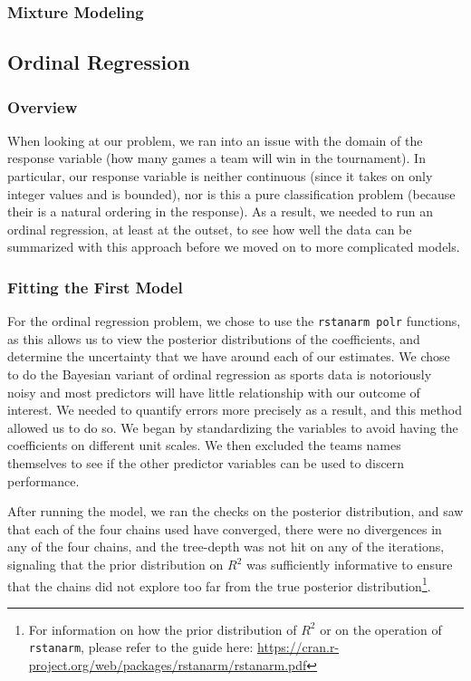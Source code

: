 \documentclass[10pt,a4paper, hidelinks]{article} %
\begin{document}
\subsubsection{Mixture Modeling}


\subsection{Ordinal Regression}
\subsubsection{Overview}
When looking at our problem, we ran into an issue with the domain of the response variable (how many games a team will win in the tournament). In particular, our response variable is neither continuous (since it takes on only integer values and is bounded), nor is this a pure classification problem (because their is a natural ordering in the response). As a result, we needed to run an ordinal regression, at least at the outset, to see how well the data can be summarized with this approach before we moved on to more complicated models.  

\subsubsection{Fitting the First Model}
For the ordinal regression problem, we chose to use the \texttt{rstanarm polr} functions, as this allows us to view the posterior distributions of the coefficients, and determine the uncertainty that we have around each of our estimates. We chose to do the Bayesian variant of ordinal regression as sports data is notoriously noisy and most predictors will have little relationship with our outcome of interest. We needed to quantify errors more precisely as a result, and this method allowed us to do so. We began by standardizing the variables to avoid having the coefficients on different unit scales. We then excluded the teams names themselves to see if the other predictor variables can be used to discern performance. 

After running the model, we ran the checks on the posterior distribution, and saw that each of the four chains used have converged, there were no divergences in any of the four chains, and the tree-depth was not hit on any of the iterations, signaling that the prior distribution on $R^2$ was sufficiently informative to ensure that the chains did not explore too far from the true posterior distribution\footnote{For information on how the prior distribution of $R^2$ or on the operation of \texttt{rstanarm}, please refer to the guide here: {\color{blue} \url{https://cran.r-project.org/web/packages/rstanarm/rstanarm.pdf}}}.
\end{document}

